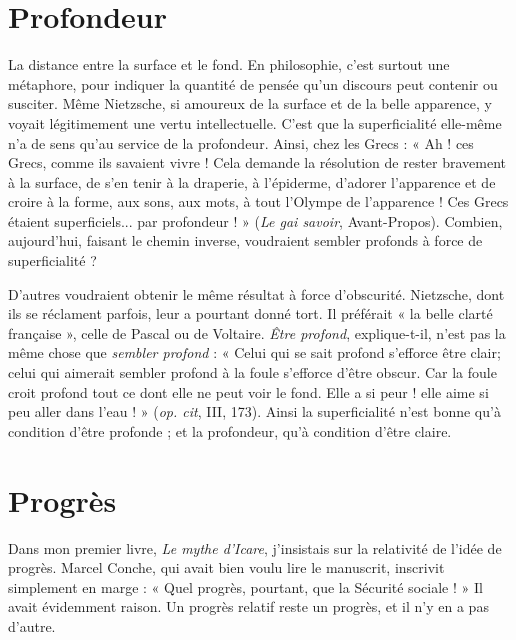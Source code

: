 \section{Profondeur}
La distance entre la surface et le fond. En philosophie,
c’est surtout une métaphore, pour indiquer la quantité de
pensée qu’un discours peut contenir ou susciter. Même Nietzsche, si amoureux
de la surface et de la belle apparence, y voyait légitimement une vertu intellectuelle.
C’est que la superficialité elle-même n’a de sens qu’au service de la profondeur.
Ainsi, chez les Grecs : « Ah ! ces Grecs, comme ils savaient vivre ! Cela
demande la résolution de rester bravement à la surface, de s’en tenir à la draperie,
à l’épiderme, d’adorer l'apparence et de croire à la forme, aux sons, aux
mots, à tout l’Olympe de l'apparence ! Ces Grecs étaient superficiels... par
profondeur ! » ({\it Le gai savoir}, Avant-Propos). Combien, aujourd’hui, faisant le
chemin inverse, voudraient sembler profonds à force de superficialité ?

D’autres voudraient obtenir le même résultat à force d’obscurité. Nietzsche,
dont ils se réclament parfois, leur a pourtant donné tort. Il préférait « la belle
clarté française », celle de Pascal ou de Voltaire. {\it Être profond}, explique-t-il, n’est
pas la même chose que {\it sembler profond} : « Celui qui se sait profond s’efforce
être clair; celui qui aimerait sembler profond à la foule s'efforce d’être
obscur. Car la foule croit profond tout ce dont elle ne peut voir le fond. Elle a
si peur ! elle aime si peu aller dans l’eau ! » ({\it op. cit}, III, 173). Ainsi la superficialité
n’est bonne qu’à condition d’être profonde ; et la profondeur, qu'à
condition d’être claire.

\section{Progrès}
Dans mon premier livre, {\it Le mythe d'Icare}, j'insistais sur la relativité
de l’idée de progrès. Marcel Conche, qui avait bien voulu
lire le manuscrit, inscrivit simplement en marge : « Quel progrès, pourtant, que
la Sécurité sociale ! » Il avait évidemment raison. Un progrès relatif reste un
progrès, et il n’y en a pas d’autre.

